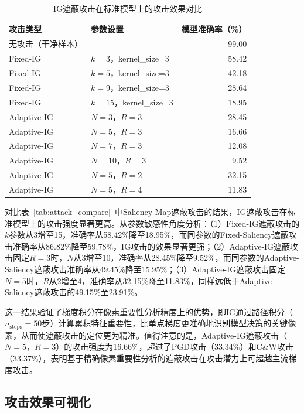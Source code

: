 \begin{table}[H]
  \centering
  \caption{IG遮蔽攻击在标准模型上的攻击效果对比}
  \label{tab:ig_attack_compare}
  \begin{tabular}{llr}
    \toprule
    \textbf{攻击类型} & \textbf{参数设置} & \textbf{模型准确率（\%）} \\
    \midrule
    无攻击（干净样本）  & ---              & 99.00 \\
    \midrule
    Fixed-IG  & $k=3$，kernel\_size=3    & 58.42 \\
    Fixed-IG  & $k=5$，kernel\_size=3    & 42.18 \\
    Fixed-IG  & $k=9$，kernel\_size=3    & 28.64 \\
    Fixed-IG  & $k=15$，kernel\_size=3   & 18.95 \\
    \midrule
    Adaptive-IG  & $N=3$，$R=3$    & 28.45 \\
    Adaptive-IG  & $N=5$，$R=3$    & 16.66 \\
    Adaptive-IG  & $N=7$，$R=3$    & 12.08 \\
    Adaptive-IG  & $N=10$，$R=3$   & 9.52 \\
    \midrule
    Adaptive-IG  & $N=5$，$R=2$    & 32.15 \\
    Adaptive-IG  & $N=5$，$R=4$    & 11.83 \\
    \bottomrule
  \end{tabular}
\end{table}

对比表~\ref{tab:attack_compare}~中Saliency Map遮蔽攻击的结果，IG遮蔽攻击在标准模型上的攻击强度显著更高。从参数敏感性角度分析：（1）Fixed-IG遮蔽攻击的$k$参数从3增至15，准确率从58.42\%降至18.95\%，而同参数的Fixed-Saliency遮蔽攻击准确率从86.82\%降至59.78\%，IG攻击的效果显著更强；（2）Adaptive-IG遮蔽攻击固定$R=3$时，$N$从3增至10，准确率从28.45\%降至9.52\%，而同参数的Adaptive-Saliency遮蔽攻击准确率从49.45\%降至15.95\%；（3）Adaptive-IG遮蔽攻击固定$N=5$时，$R$从2增至4，准确率从32.15\%降至11.83\%，同样远低于Adaptive-Saliency遮蔽攻击的49.15\%至23.91\%。

这一结果验证了梯度积分在像素重要性分析精度上的优势，即IG通过路径积分（$n_{\text{steps}}=50$步）计算累积特征重要性，比单点梯度更准确地识别模型决策的关键像素，从而使遮蔽攻击的定位更为精准。值得注意的是，Adaptive-IG遮蔽攻击（$N=5$，$R=3$）的攻击强度为16.66\%，超过了PGD攻击（33.34\%）和C\&W攻击（33.37\%），表明基于精确像素重要性分析的遮蔽攻击在攻击潜力上可超越主流梯度攻击。

\subsection{攻击效果可视化}

